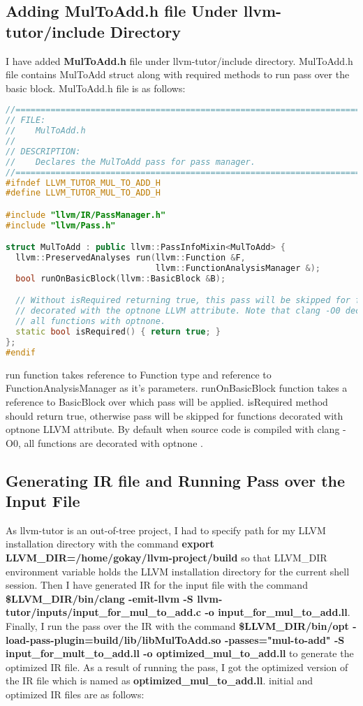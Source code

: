 \documentclass[16pt]{article}
\begin{document}
\subsection{Adding MulToAdd.h file Under llvm-tutor/include Directory}
I have added \textbf{MulToAdd.h} file under llvm-tutor/include directory. MulToAdd.h file contains MulToAdd struct along with required methods to run pass over the basic block. MulToAdd.h file is as follows: 

\vspace{2.5pt}
\begin{lstlisting}[caption=MulToAdd.h Header File, label=mul-to-add-header-file,
style=chstyle,language=C++]
//========================================================================
// FILE:
//    MulToAdd.h
//
// DESCRIPTION:
//    Declares the MulToAdd pass for pass manager.
//========================================================================
#ifndef LLVM_TUTOR_MUL_TO_ADD_H
#define LLVM_TUTOR_MUL_TO_ADD_H

#include "llvm/IR/PassManager.h"
#include "llvm/Pass.h"

struct MulToAdd : public llvm::PassInfoMixin<MulToAdd> {
  llvm::PreservedAnalyses run(llvm::Function &F,
                              llvm::FunctionAnalysisManager &);
  bool runOnBasicBlock(llvm::BasicBlock &B);

  // Without isRequired returning true, this pass will be skipped for functions
  // decorated with the optnone LLVM attribute. Note that clang -O0 decorates
  // all functions with optnone.
  static bool isRequired() { return true; }
};
#endif
\end{lstlisting}

run function takes reference to Function type and reference to FunctionAnalysisManager as it's parameters. runOnBasicBlock function takes a reference to BasicBlock over which pass will be applied. isRequired method should return true, otherwise pass will be skipped for functions 
decorated with optnone LLVM attribute. By default when source code is compiled with clang -O0, all functions are decorated with optnone \cite{writingLLVMPass}.

\subsection{Generating IR file and Running Pass over the Input File}
As llvm-tutor is an out-of-tree project, I had to specify path for my LLVM installation directory with the command \textbf{export LLVM\_DIR=/home/gokay/llvm-project/build} so that LLVM\_DIR environment variable holds the LLVM installation directory for the current shell session. Then I have generated IR for the input file with the command \textbf{\$LLVM\_DIR/bin/clang -emit-llvm -S llvm-tutor/inputs/input\_for\_mul\_to\_add.c -o input\_for\_mul\_to\_add.ll}. Finally, I run the pass over the IR with the command \textbf{\$LLVM\_DIR/bin/opt -load-pass-plugin=build/lib/libMulToAdd.so -passes="mul-to-add" -S input\_for\_mult\_to\_add.ll -o optimized\_mul\_to\_add.ll} to generate the optimized IR file. As a result of running the pass, I got the optimized version of the IR file which is named as \textbf{optimized\_mul\_to\_add.ll}. initial and optimized IR files are as follows: 
\end{document}
